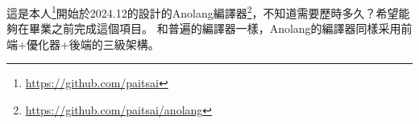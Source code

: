 


這是本人\footnote{\url{https://github.com/paitsai}}開始於2024.12的設計的Anolang編譯器\footnote{\url{https://github.com/paitsai/anolang}}，不知道需要歷時多久？希望能夠在畢業之前完成這個項目。
和普遍的編譯器一樣，Anolang的編譯器同樣采用前端+優化器+後端的三級架構。






